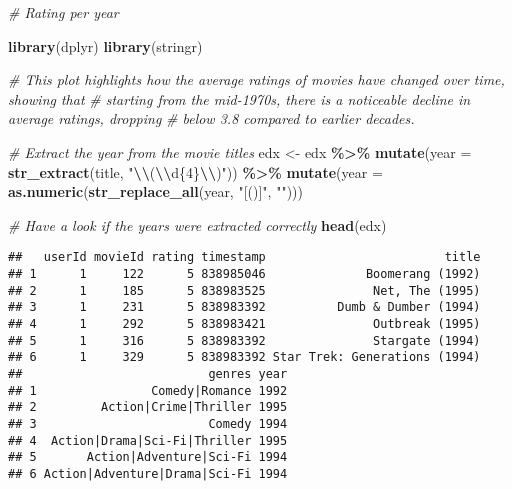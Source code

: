 \documentclass[
]{article}
\newenvironment{Shaded}{\begin{snugshade}}{\end{snugshade}}
\newcommand{\AttributeTok}[1]{\textcolor[rgb]{0.13,0.29,0.53}{#1}}
\newcommand{\CommentTok}[1]{\textcolor[rgb]{0.56,0.35,0.01}{\textit{#1}}}
\newcommand{\FunctionTok}[1]{\textcolor[rgb]{0.13,0.29,0.53}{\textbf{#1}}}
\newcommand{\NormalTok}[1]{#1}
\newcommand{\OtherTok}[1]{\textcolor[rgb]{0.56,0.35,0.01}{#1}}
\newcommand{\SpecialCharTok}[1]{\textcolor[rgb]{0.81,0.36,0.00}{\textbf{#1}}}
\newcommand{\StringTok}[1]{\textcolor[rgb]{0.31,0.60,0.02}{#1}}
\begin{document}
\begin{Shaded}
\begin{Highlighting}[]
\CommentTok{\# Rating per year }

\FunctionTok{library}\NormalTok{(dplyr)}
\FunctionTok{library}\NormalTok{(stringr)}

\CommentTok{\# This plot highlights how the average ratings of movies have changed over time, showing that }
\CommentTok{\# starting from the mid{-}1970s, there is a noticeable decline in average ratings, dropping}
\CommentTok{\# below 3.8 compared to earlier decades.}

\CommentTok{\# Extract the year from the movie titles}
\NormalTok{edx }\OtherTok{\textless{}{-}}\NormalTok{ edx }\SpecialCharTok{\%\textgreater{}\%}
  \FunctionTok{mutate}\NormalTok{(}\AttributeTok{year =} \FunctionTok{str\_extract}\NormalTok{(title, }\StringTok{"}\SpecialCharTok{\textbackslash{}\textbackslash{}}\StringTok{(}\SpecialCharTok{\textbackslash{}\textbackslash{}}\StringTok{d\{4\}}\SpecialCharTok{\textbackslash{}\textbackslash{}}\StringTok{)"}\NormalTok{)) }\SpecialCharTok{\%\textgreater{}\%}
  \FunctionTok{mutate}\NormalTok{(}\AttributeTok{year =} \FunctionTok{as.numeric}\NormalTok{(}\FunctionTok{str\_replace\_all}\NormalTok{(year, }\StringTok{"[()]"}\NormalTok{, }\StringTok{""}\NormalTok{)))}

\CommentTok{\# Have a look if the years were extracted correctly}
\FunctionTok{head}\NormalTok{(edx)}
\end{Highlighting}
\end{Shaded}

\begin{verbatim}
##   userId movieId rating timestamp                         title
## 1      1     122      5 838985046              Boomerang (1992)
## 2      1     185      5 838983525               Net, The (1995)
## 3      1     231      5 838983392          Dumb & Dumber (1994)
## 4      1     292      5 838983421               Outbreak (1995)
## 5      1     316      5 838983392               Stargate (1994)
## 6      1     329      5 838983392 Star Trek: Generations (1994)
##                          genres year
## 1                Comedy|Romance 1992
## 2         Action|Crime|Thriller 1995
## 3                        Comedy 1994
## 4  Action|Drama|Sci-Fi|Thriller 1995
## 5       Action|Adventure|Sci-Fi 1994
## 6 Action|Adventure|Drama|Sci-Fi 1994
\end{verbatim}
\end{document}
